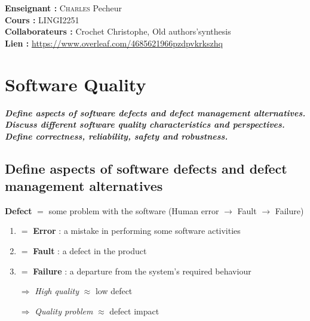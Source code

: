 \documentclass{article}
\begin{document}
        \vspace*{\fill}

        \begin{minipage}{11cm}\noindent\textbf{Enseignant :} \textsc{Charles} Pecheur\\
                \noindent\textbf{Cours :} LINGI2251\\
                \noindent\textbf{Collaborateurs :} Crochet Christophe, Old authors'synthesis\\
                \noindent\textbf{Lien :} \url{https://www.overleaf.com/4685621966pzdpvkrkszhq}\\
        \end{minipage}
\newpage

\tableofcontents

\newpage
{}


%
%


\section{Software Quality}
\textbf{\textit{Define aspects of software defects and defect management alternatives. Discuss different software quality characteristics and perspectives. Define correctness, reliability, safety and robustness.}}

\subsection{Define aspects of software defects and defect management alternatives}
\noindent \textbf{Defect} $=$ some problem with the software (Human error $\rightarrow$ Fault $\rightarrow$ Failure)
\begin{enumerate}
    \item $=$ \textbf{Error} : a mistake in performing some software activities
    \item $=$ \textbf{Fault} : a defect in the product
    \item $=$ \textbf{Failure} : a departure from the system's required behaviour
\end{enumerate}
\vspace{.5em}
\begin{enumerate}
    \item[$\Rightarrow$] \textit{High quality} $\approx$ low defect
    \item[$\Rightarrow$] \textit{Quality problem} $\approx$ defect impact
\end{enumerate}
\end{document}
